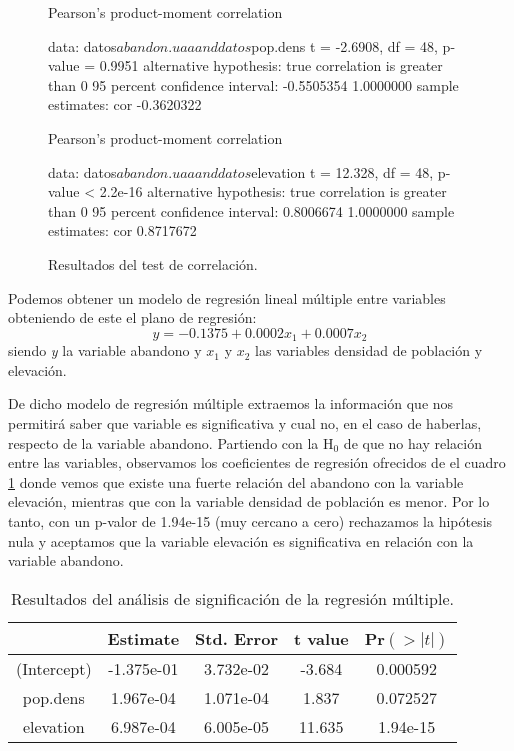 \documentclass[11pt,a4paper]{article}
\begin{document}
\begin{figure}
\centering
\begin{boxedverbatim}
    Pearson's product-moment correlation

data:  datos$abandon.uaa and datos$pop.dens
t = -2.6908, df = 48, p-value = 0.9951
alternative hypothesis: true correlation is greater than 0
95 percent confidence interval:
 -0.5505354  1.0000000
sample estimates:
       cor 
-0.3620322
\end{boxedverbatim}

\begin{boxedverbatim}
    Pearson's product-moment correlation

data:  datos$abandon.uaa and datos$elevation
t = 12.328, df = 48, p-value < 2.2e-16
alternative hypothesis: true correlation is greater than 0
95 percent confidence interval:
 0.8006674 1.0000000
sample estimates:
       cor 
0.8717672 
\end{boxedverbatim}
\caption{Resultados del test de correlación.}
\label{fig:res.corr}
\end{figure}

Podemos obtener un modelo de regresión lineal múltiple entre variables obteniendo de este el plano de regresión:
\begin{equation}
y=-0.1375+0.0002x_{1}+0.0007x_{2}
\label{eq:regre.multi}
\end{equation}
\noindent siendo \textit{y} la variable abandono y $x_{1}$ y $x_2$ las variables densidad de población y elevación.

De dicho modelo de regresión múltiple extraemos la información que nos permitirá saber que variable es significativa y cual no, en el caso de haberlas, respecto de la variable abandono. Partiendo con la H$_0$ de que no hay relación entre las variables, observamos los coeficientes de regresión ofrecidos de el cuadro \ref{tab:coef.multi} donde vemos que existe una fuerte relación del abandono con la variable elevación, mientras que con la variable densidad de población es menor. Por lo tanto, con un p-valor de 1.94e-15 (muy cercano a cero) rechazamos la hipótesis nula y aceptamos que la variable elevación es significativa en relación con la variable abandono.

\begin{table}
\centering
\begin{tabular}{ccccc}
\toprule[0.4mm]
& Estimate & Std. Error & t value & Pr$(>|t|)$\\
\midrule
(Intercept) & -1.375e-01 & 3.732e-02 & -3.684 & 0.000592\\
pop.dens & 1.967e-04 & 1.071e-04 & 1.837 & 0.072527\\
elevation & 6.987e-04 & 6.005e-05 & 11.635 & 1.94e-15\\
\bottomrule[0.4mm]
\end{tabular}
\caption{Resultados del análisis de significación de la regresión múltiple.}
\label{tab:coef.multi}
\end{table}
\end{document}
